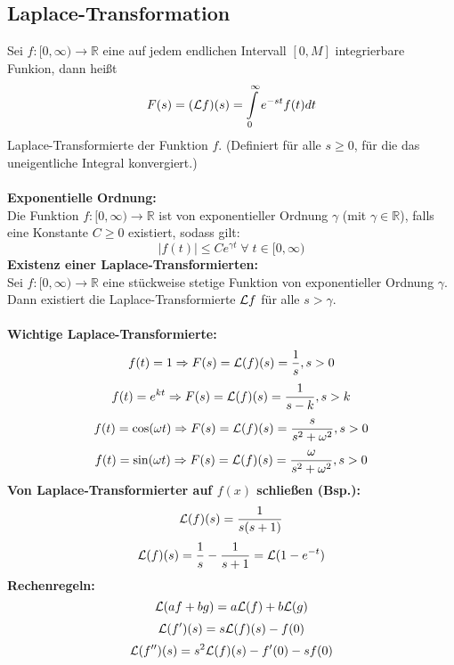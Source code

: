 \documentclass[a4paper,twocolumn,10pt]{article}
\begin{document}
\subsection{Laplace-Transformation}
Sei $f: [0,\infty) \rightarrow\mathbb{R}$ eine auf jedem endlichen Intervall $[0,M]$ integrierbare Funkion, dann heißt
\begin{equation*}
F(s)=({\cal L}f)(s)=\int\limits_{0}^{\infty}e^{-st}f(t)dt
\end{equation*}
Laplace-Transformierte der Funktion $f$. (Definiert für alle $s\geq 0$, für die das uneigentliche Integral konvergiert.)\\\\
\textbf{Exponentielle Ordnung:}\\
Die Funktion $f:[0,\infty)\rightarrow\mathbb{R}$ ist von exponentieller Ordnung $\gamma$ (mit $\gamma\in\mathbb{R}$), falls eine Konstante $C\geq 0$ existiert, sodass gilt:
\begin{equation*}
|f(t)|\leq Ce^{\gamma t}\;\forall\;t\in[0,\infty)
\end{equation*}
\textbf{Existenz einer Laplace-Transformierten:}\\
Sei $f:[0,\infty)\rightarrow\mathbb{R}$ eine stückweise stetige Funktion von exponentieller Ordnung $\gamma$. Dann existiert die Laplace-Transformierte ${\cal L}f$ für alle $s>\gamma$.\\\\
\textbf{Wichtige Laplace-Transformierte:}\\
\begin{equation*}
f(t)=1\Rightarrow F(s)={\cal L}(f)(s)=\frac{1}{s},s>0
\end{equation*}
\begin{equation*}
f(t)=e^{kt}\Rightarrow F(s)={\cal L}(f)(s)=\frac{1}{s-k},s>k
\end{equation*}
\begin{equation*}
f(t)=\cos(\omega t)\Rightarrow F(s)={\cal L}(f)(s)=\frac{s}{s^2+\omega^2},s>0
\end{equation*}
\begin{equation*}
f(t)=\sin(\omega t)\Rightarrow F(s)={\cal L}(f)(s)=\frac{\omega}{s^2+\omega^2}, s>0
\end{equation*}
\textbf{\textbf{Von Laplace-Transformierter auf $f(x)$ schließen (Bsp.):}}\\
\begin{equation*}
{\cal L}(f)(s)=\frac{1}{s(s+1)}
\end{equation*}
\begin{equation*}
{\cal L}(f)(s)=\frac{1}{s}-\frac{1}{s+1}={\cal L}(1-e^{-t})
\end{equation*}
\textbf{Rechenregeln:}\\
\begin{equation*}
{\cal L}(af+bg)=a{\cal L}(f)+b{\cal L}(g)
\end{equation*}
\begin{equation*}
{\cal L}(f')(s)=s{\cal L}(f)(s)-f(0)
\end{equation*}
\begin{equation*}
{\cal L}(f'')(s)=s^2{\cal L}(f)(s)-f'(0)-sf(0)
\end{equation*}
\end{document}
